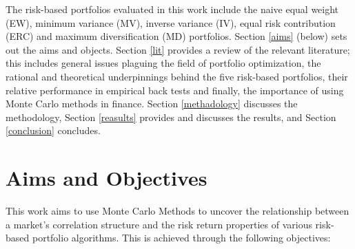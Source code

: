 \documentclass[11pt,preprint, authoryear]{elsarticle}
\numberwithin{equation}{section}
\numberwithin{figure}{section}
\numberwithin{table}{section}
\begin{document}
The risk-based portfolios evaluated in this work include the naive equal
weight (EW), minimum variance (MV), inverse variance (IV), equal risk
contribution (ERC) and maximum diversification (MD) portfolios. Section
\ref{aims} (below) sets out the aims and objects. Section \ref{lit}
provides a review of the relevant literature; this includes general
issues plaguing the field of portfolio optimization, the rational and
theoretical underpinnings behind the five risk-based portfolios, their
relative performance in empirical back tests and finally, the importance
of using Monte Carlo methods in finance. Section \ref{methadology}
discusses the methodology, Section \ref{reasults} provides and discusses
the results, and Section \ref{conclusion} concludes.

\hypertarget{aims-and-objectives}{%
\section{\texorpdfstring{Aims and Objectives
\label{aims}}{Aims and Objectives }}\label{aims-and-objectives}}

This work aims to use Monte Carlo Methods to uncover the relationship
between a market's correlation structure and the risk return properties
of various risk-based portfolio algorithms. This is achieved through the
following objectives:
\end{document}
